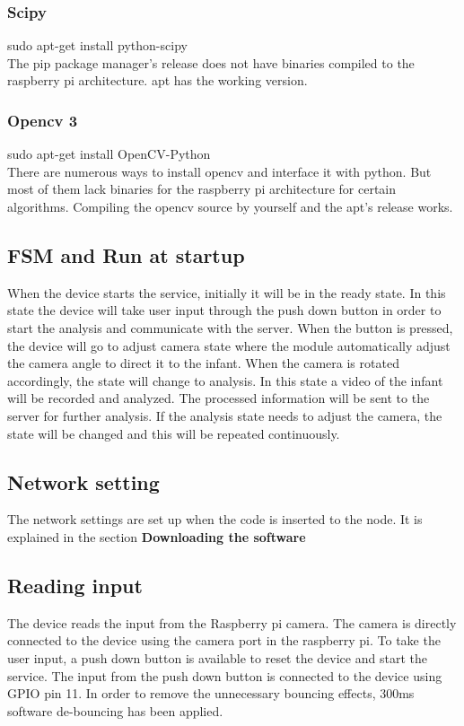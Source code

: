 \documentclass{report}
\begin{document}
\subsubsection{Scipy}
sudo apt-get install python-scipy\\
The pip package manager's release does not have binaries compiled to the raspberry pi architecture. apt has the working version.

\subsubsection{Opencv 3}
sudo apt-get install OpenCV-Python\\
There are numerous ways to install opencv and interface it with python. But most of them lack binaries for the raspberry pi architecture for certain algorithms. Compiling the opencv source by yourself and the apt's release works.



\subsection{FSM and Run at startup}  

When the device starts the service, initially it will be in the ready state. In this state the device will take user input through the push down button in order to start the analysis and communicate with the server. When the button is pressed, the device will go to adjust camera state where the module automatically adjust the camera angle to direct it to the infant. When the camera is rotated accordingly, the state will change to analysis. In this state a video of the infant will be recorded and analyzed. The processed information will be sent to the server for further analysis. If the analysis state needs to adjust the camera, the state will be changed and this will be repeated continuously. 

\subsection{Network setting}
The network settings are set up when the code is inserted to the node. It is explained in the section \textbf{Downloading the software}


\subsection{Reading input}
The device reads the input from the Raspberry pi camera. The camera is directly connected to the device using the camera port in the raspberry pi. To take the user input, a push down button is available to reset the device and start the service. The input from the push down button is connected to the device using GPIO pin 11. In order to remove the unnecessary bouncing effects, 300ms software de-bouncing has been applied.
\end{document}
